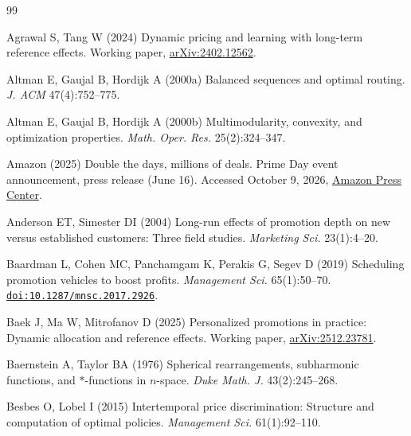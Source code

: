\setlength{\bibsep}{0pt}
\begin{thebibliography}{99}

Agrawal S, Tang W (2024) Dynamic pricing and learning with long-term reference effects. Working paper, \href{https://arxiv.org/abs/2402.12562}{arXiv:2402.12562}.

Altman E, Gaujal B, Hordijk A (2000a) Balanced sequences and optimal routing. \emph{J. ACM} 47(4):752--775.

Altman E, Gaujal B, Hordijk A (2000b) Multimodularity, convexity, and optimization properties. \emph{Math. Oper. Res.} 25(2):324--347.

Amazon (2025) Double the days, millions of deals. Prime Day event announcement, press release (June 16). Accessed October 9, 2026, \href{https://press.aboutamazon.com/2025/6/double-the-days-millions-of-deals-amazon-announces-prime-day-event-from-july-8-to-july-11-offering-members-more-time-to-shop-and-save}{Amazon Press Center}.

Anderson ET, Simester DI (2004) Long-run effects of promotion depth on new versus established customers: Three field studies. \emph{Marketing Sci.} 23(1):4--20.

Baardman L, Cohen MC, Panchamgam K, Perakis G, Segev D (2019) Scheduling promotion vehicles to boost profits. \emph{Management Sci.} 65(1):50--70. \href{https://doi.org/10.1287/mnsc.2017.2926}{\nolinkurl{doi:10.1287/mnsc.2017.2926}}.

Baek J, Ma W, Mitrofanov D (2025) Personalized promotions in practice: Dynamic allocation and reference effects. Working paper, \href{https://arxiv.org/abs/2512.23781}{arXiv:2512.23781}.

 {\color{black} Baernstein A, Taylor BA (1976) Spherical rearrangements, subharmonic functions, and $*$-functions in $n$-space. \emph{Duke Math. J.} 43(2):245--268.}

 {\color{black} Besbes O, Lobel I (2015) Intertemporal price discrimination: Structure and computation of optimal policies. \emph{Management Sci.} 61(1):92--110.}


\end{thebibliography}
